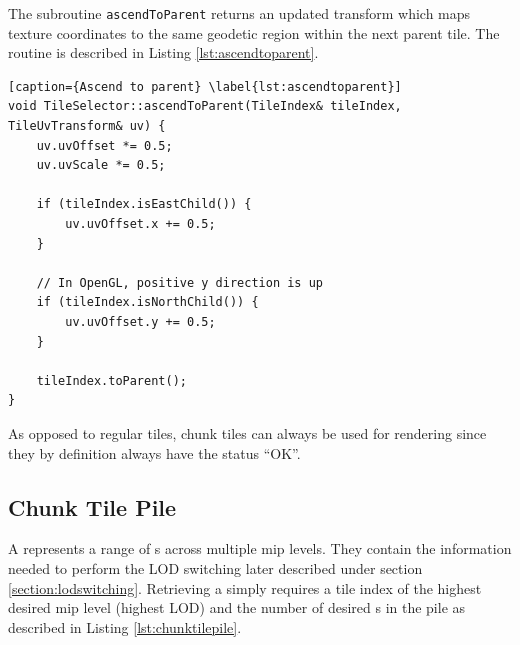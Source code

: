  
The subroutine \texttt{ascendToParent} returns an updated transform which maps texture coordinates to the same geodetic region within the next parent tile. The routine is described in Listing \ref{lst:ascendtoparent}.

\begin{lstlisting}[caption={Ascend to parent} \label{lst:ascendtoparent}]
void TileSelector::ascendToParent(TileIndex& tileIndex, TileUvTransform& uv) {
    uv.uvOffset *= 0.5;
    uv.uvScale *= 0.5;

    if (tileIndex.isEastChild()) {
        uv.uvOffset.x += 0.5;
    }

    // In OpenGL, positive y direction is up
    if (tileIndex.isNorthChild()) {
        uv.uvOffset.y += 0.5;
    }

    tileIndex.toParent();
}
\end{lstlisting}

As opposed to regular tiles, chunk tiles can always be used for rendering since they by definition always have the status ``OK''.

\subsection{Chunk Tile Pile}
\label{section:chunktilepile}

A  represents a range of s across multiple mip levels. They contain the information needed to perform the LOD switching later described under section \ref{section:lodswitching}. Retrieving a  simply requires a tile index of the highest desired mip level (highest LOD) and the number of desired s in the pile as described in Listing \ref{lst:chunktilepile}.

